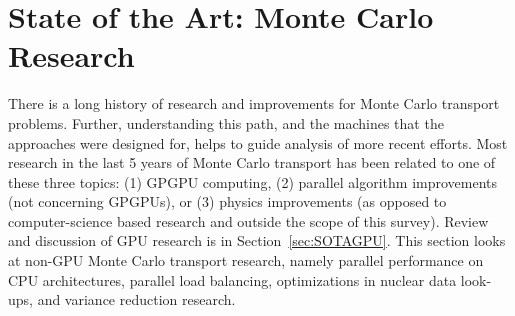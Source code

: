 \section{ \textbf{ State of the Art: Monte Carlo Research} }

There is a long history of research and improvements for Monte Carlo transport problems.
%
Further, understanding this path, and the machines that the approaches were designed for, helps to guide analysis of more recent efforts.
%
Most research in the last 5 years of Monte Carlo transport has been related to one of these three topics: (1) GPGPU computing, (2) parallel algorithm improvements (not concerning GPGPUs), or (3) physics improvements (as opposed to computer-science based research and outside the scope of this survey).
%
Review and discussion of GPU research is in Section~\ref{sec:SOTAGPU}.
%
This section looks at non-GPU Monte Carlo transport research, namely parallel performance on CPU architectures, parallel load balancing, optimizations in nuclear data look-ups, and variance reduction research.
%
